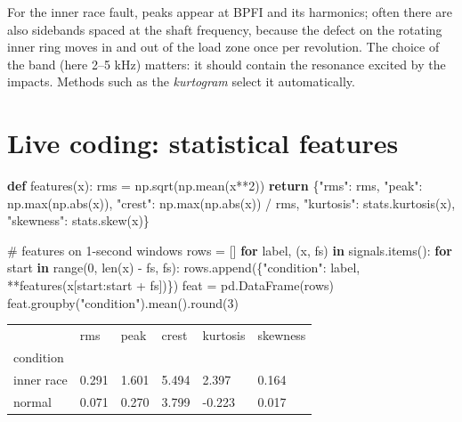 \documentclass[
  letterpaper,
  DIV=11,
  numbers=noendperiod]{scrreprt}
\newenvironment{Shaded}{\begin{snugshade}}{\end{snugshade}}
\newcommand{\BuiltInTok}[1]{\textcolor[rgb]{0.00,0.23,0.31}{#1}}
\newcommand{\CommentTok}[1]{\textcolor[rgb]{0.37,0.37,0.37}{#1}}
\newcommand{\ControlFlowTok}[1]{\textcolor[rgb]{0.00,0.23,0.31}{\textbf{#1}}}
\newcommand{\DecValTok}[1]{\textcolor[rgb]{0.68,0.00,0.00}{#1}}
\newcommand{\KeywordTok}[1]{\textcolor[rgb]{0.00,0.23,0.31}{\textbf{#1}}}
\newcommand{\NormalTok}[1]{\textcolor[rgb]{0.00,0.23,0.31}{#1}}
\newcommand{\OperatorTok}[1]{\textcolor[rgb]{0.37,0.37,0.37}{#1}}
\newcommand{\StringTok}[1]{\textcolor[rgb]{0.13,0.47,0.30}{#1}}
\begin{document}
For the inner race fault, peaks appear at BPFI and its harmonics; often
there are also sidebands spaced at the shaft frequency, because the
defect on the rotating inner ring moves in and out of the load zone once
per revolution. The choice of the band (here 2--5 kHz) matters: it
should contain the resonance excited by the impacts. Methods such as the
\emph{kurtogram} select it automatically.

\section{Live coding: statistical
features}\label{live-coding-statistical-features}

\begin{Shaded}
\begin{Highlighting}[]
\KeywordTok{def}\NormalTok{ features(x):}
\NormalTok{    rms }\OperatorTok{=}\NormalTok{ np.sqrt(np.mean(x}\OperatorTok{**}\DecValTok{2}\NormalTok{))}
    \ControlFlowTok{return}\NormalTok{ \{}\StringTok{"rms"}\NormalTok{: rms, }\StringTok{"peak"}\NormalTok{: np.}\BuiltInTok{max}\NormalTok{(np.}\BuiltInTok{abs}\NormalTok{(x)), }\StringTok{"crest"}\NormalTok{: np.}\BuiltInTok{max}\NormalTok{(np.}\BuiltInTok{abs}\NormalTok{(x)) }\OperatorTok{/}\NormalTok{ rms,}
            \StringTok{"kurtosis"}\NormalTok{: stats.kurtosis(x), }\StringTok{"skewness"}\NormalTok{: stats.skew(x)\}}

\CommentTok{\# features on 1{-}second windows}
\NormalTok{rows }\OperatorTok{=}\NormalTok{ []}
\ControlFlowTok{for}\NormalTok{ label, (x, fs) }\KeywordTok{in}\NormalTok{ signals.items():}
    \ControlFlowTok{for}\NormalTok{ start }\KeywordTok{in} \BuiltInTok{range}\NormalTok{(}\DecValTok{0}\NormalTok{, }\BuiltInTok{len}\NormalTok{(x) }\OperatorTok{{-}}\NormalTok{ fs, fs):}
\NormalTok{        rows.append(\{}\StringTok{"condition"}\NormalTok{: label, }\OperatorTok{**}\NormalTok{features(x[start:start }\OperatorTok{+}\NormalTok{ fs])\})}
\NormalTok{feat }\OperatorTok{=}\NormalTok{ pd.DataFrame(rows)}
\NormalTok{feat.groupby(}\StringTok{"condition"}\NormalTok{).mean().}\BuiltInTok{round}\NormalTok{(}\DecValTok{3}\NormalTok{)}
\end{Highlighting}
\end{Shaded}

\begin{longtable}[]{@{}llllll@{}}
\toprule\noalign{}
& rms & peak & crest & kurtosis & skewness \\
condition & & & & & \\
\midrule\noalign{}
\endhead
\bottomrule\noalign{}
\endlastfoot
inner race & 0.291 & 1.601 & 5.494 & 2.397 & 0.164 \\
normal & 0.071 & 0.270 & 3.799 & -0.223 & 0.017 \\
\end{longtable}
\end{document}
